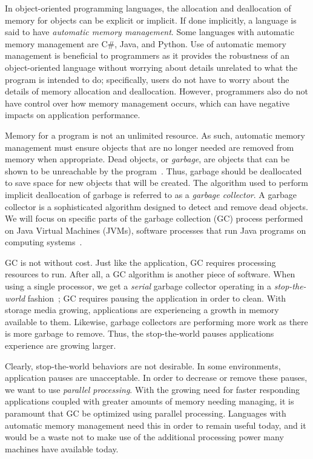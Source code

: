 \documentclass{sig-alternate}
\begin{document}
In object-oriented programming languages, the allocation and deallocation
of memory for objects can be explicit or implicit. If done implicitly,
a language is said to have \emph{automatic memory management}. Some languages 
with automatic memory management are C\#, Java, and Python.
Use of automatic memory management is beneficial to programmers as it provides
the robustness of an object-oriented language without worrying about
details unrelated to what the program is intended to do; specifically, users do
not have to worry about the details of memory allocation and deallocation. 
However, programmers also do not have control over how memory management occurs,
which can have negative impacts on application performance.

Memory for a program is not an unlimited resource. As such, automatic memory management
must ensure objects that are no longer needed are removed from memory
when appropriate. Dead objects, or \emph{garbage}, are objects that can be shown
to be unreachable by the program~\cite{glossary:g}. Thus, garbage should be deallocated to 
save space for new objects that will be created. The algorithm used to perform implicit
deallocation of garbage is referred to as a \emph{garbage collector}.
A garbage collector is a sophisticated algorithm designed to detect
and remove dead objects. We will focus on specific parts of the 
garbage collection (GC) process performed on Java Virtual Machines 
(JVMs), software processes that run Java programs on computing systems~\cite{Lindblom:2011}.

GC is not without cost.
Just like the application, GC requires processing resources to run. After all,
a GC algorithm is another piece of software. When using a single processor, 
we get a \emph{serial} garbage collector operating in a 
\emph{stop-the-world} fashion~\cite{Lindblom:2011}; GC requires
pausing the application in order to clean. With storage media growing, 
applications are experiencing a growth in memory
available to them. Likewise, garbage collectors are performing more
work as there is more garbage to remove. Thus, the stop-the-world
pauses applications experience are growing larger.

Clearly, stop-the-world behaviors are not desirable. In some environments,
application pauses are unacceptable. In order to decrease or remove these 
pauses, we want to use \emph{parallel processing}. With the growing
need for faster responding applications coupled with greater amounts of memory needing managing,
it is paramount that GC be optimized using parallel processing. Languages with
automatic memory management need this in order to remain useful today,
and it would be a waste not to make use of the additional processing power
many machines have available today.
\end{document}
